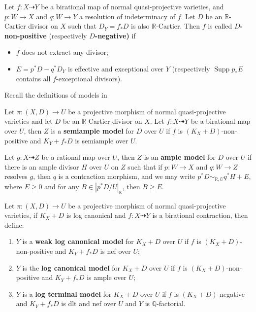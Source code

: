 \begin{definition}\label{negativemap}
	\cite[Definition 3.6.1]{BCHM10} Let $f:X\dashrightarrow Y$ be a birational map of normal quasi-projective varieties, and $p:W\to X$ and $q:W\to Y$  a resolution of indeterminacy of $f$. Let $D$ be an $\mathbb{R}$-Cartier divisor on $X$ such that  $D_{Y}=f_*D$ is  also $\mathbb{R}$-Cartier. Then $f$ is called \textbf{$D$-non-positive} (respectively \textbf{$D$-negative)} if
	\begin{itemize}
		\item $f$ does not extract any divisor;
		\item $E=p^{*}D-q^*D_Y$ is effective and exceptional over $Y$ (respectively $\operatorname{Supp}p_*E$ contains all $f$-exceptional divisors).
	\end{itemize}
\end{definition}

Recall the definitions of models in \cite{BCHM10}
\begin{definition}
	\cite[Definition 3.6.5]{BCHM10} Let $ \pi:(X,D)\to U $ be a projective morphism of normal quasi-projective varieties and let $D$ be an $\mathbb{R}$-Cartier divisor on $X$. Let $ f: X\dashrightarrow Y $ be a birational map over $ U $, then $ Z $ is a \textbf{semiample model } for $ D $ over $ U $ if $ f $ is $ (K_X+D) $-non-positive and $ K_Y+f_*D $ is semiample over $ U $.

	Let $ g:X\dashrightarrow Z $ be a rational map over $ U $, then $ Z $ is an \textbf{ample model } for $ D $ over $ U $ if there is  an ample divisor $H$  over $U$  on $Z$  such that if $p:W \to X $ and $q:W \to Z $ resolves $g$, then $q$ is a contraction morphism, and we may write $p^*D \sim_{\mathbb{R},U} q^*H+E$, where $E\geqslant 0$ and for any $B \in |p^*D/U|_{\mathbb{R}}$, then $B\geqslant E$.
\end{definition}
\begin{definition}\label{models}
	\cite[Definition 3.6.7]{BCHM10} Let $ \pi:(X,D)\to U $ be a projective morphism of normal quasi-projective varieties, if $ K_X+D $ is log canonical and $ f:X\dashrightarrow Y $ is a birational contraction, then define:
	\begin{enumerate}
		\item $ Y $ is a \textbf{weak log canonical model} for $ K_X+D $ over $ U $ if $ f $ is $ (K_X+D) $-non-positive and $ K_Y+f_*D $ is nef over $ U $;
		\item $ Y $ is the \textbf{log canonical model} for $ K_X+D $ over $ U $ if $ f $ is $ (K_X+D) $-non-positive and $ K_Y+f_*D $ is ample over $ U $;
		\item $ Y $ is  a \textbf{log terminal model} for $ K_X+D $ over $ U $ if $ f $ is $ (K_X+D)$-negative and $ K_Y+f_*D $ is dlt and nef over $ U $ and $ Y $ is $ \mathbb{Q} $-factorial.
	\end{enumerate}
\end{definition}

